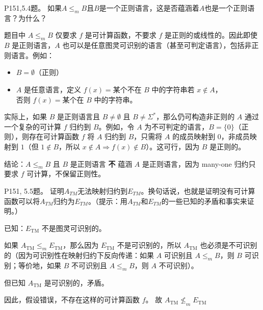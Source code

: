 \documentclass[11pt,addpoints,answers]{exam}
\begin{document}
\begin{questions}
\question P151,5.4题。
如果$A\leq _{m} B$且$B$是一个正则语言，这是否蕴涵着$A$也是一个正则语言？为什么？
\begin{solution}
    	题目中 $A \leq_m B$ 仅要求 $f$ 是可计算函数，不要求 $f$ 是正则的或线性的。因此即使 $B$ 是正则语言，$A$ 也可以是任意图灵可识别的语言（甚至可判定语言），包括非正则语言。例如：
    \begin{itemize}
        \item $B = \emptyset$（正则）
        \item $A$ 是任意语言，定义 $f(x) = \text{某个不在 } B \text{ 中的字符串若 } x \notin A$，\\否则 $f(x) = \text{某个在 } B \text{ 中的字符串}$。
    \end{itemize}
    实际上，如果 $B$ 是正则语言且 $B \neq \emptyset$ 且 $B \neq \Sigma^*$，那么仍可构造非正则的 $A$ 通过一个复杂的可计算 $f$ 归约到 $B$。例如，令 $A$ 为不可判定的语言，$B = \{0\}$（正则），则存在可计算函数 $f$ 将 $A$ 归约到 $B$，只需将 $A$ 的成员映射到 $0$，非成员映射到 $1$（但 $1 \notin B$，所以 $x \notin A \Rightarrow f(x) \notin B$）。这可行，因为 $B$ 是正则的。
    
    结论：$A \leq_m B$ 且 $B$ 是正则语言 \textbf{不} 蕴涵 $A$ 是正则语言，因为 many-one 归约只要求 $f$ 可计算，不保留正则性。

\end{solution}



\question P151, 5.5题。
证明$A_{\textit{TM}}$无法映射归约到$E_{\textit{TM}}$。换句话说，也就是证明没有可计算函数可以将$A_{\textit{TM}}$归约为$E_{\textit{TM}}$。（提示：用$A_{\textit{TM}}$和$E_{\textit{TM}}$的一些已知的矛盾和事实来证明。）
\begin{solution}
	已知：$E_{\text{TM}}$ 不是图灵可识别的。
    
    如果 $A_{\text{TM}} \leq_m E_{\text{TM}}$，那么因为 $E_{\text{TM}}$ 不是可识别的，所以 $A_{\text{TM}}$ 也必须是不可识别的（因为可识别性在映射归约下反向传递：如果 $A$ 可识别且 $A \leq_m B$，则 $B$ 可识别；等价地，如果 $B$ 不可识别且 $A \leq_m B$，则 $A$ 不可识别）。
    
    但已知 $A_{\text{TM}}$ 是可识别的，矛盾。
    
    因此，假设错误，不存在这样的可计算函数 $f$。
    故 $A_{\text{TM}} \not\leq_m E_{\text{TM}}$
\end{solution}



\end{questions}
\end{document}
